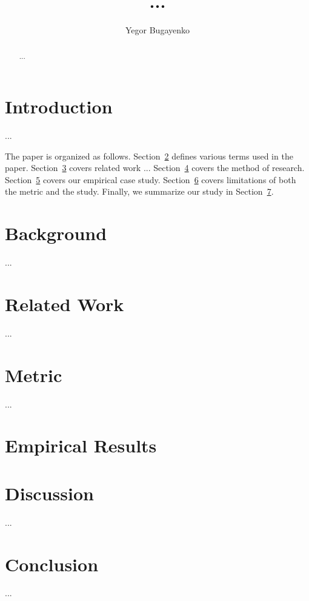\documentclass[anonymous,sigconf,10pt,nonacm=true]{acmart}
\title{...}
\author{Yegor Bugayenko}{}{}
\affiliation{%
  \institution{Huawei Technologies Co., Ltd.}
  \city{Moscow, Russia}
}
\begin{document}
\begin{abstract}
...
\end{abstract}
\maketitle

\section{Introduction}

...

The paper is organized as follows.
Section~\ref{sec:background} defines various terms used in the paper.
Section~\ref{sec:related} covers related work ...
Section~\ref{sec:method} covers the method of research.
Section~\ref{sec:results} covers our empirical case study.
Section~\ref{sec:discussion} covers limitations of both the metric and the study.
Finally, we summarize our study in Section~\ref{sec:conclusion}.

\section{Background}
\label{sec:background}

...

\section{Related Work}
\label{sec:related}

...

\section{Metric}
\label{sec:method}

...

\section{Empirical Results}
\label{sec:results}



\section{Discussion}
\label{sec:discussion}

...

\section{Conclusion}
\label{sec:conclusion}

...



\end{document}
